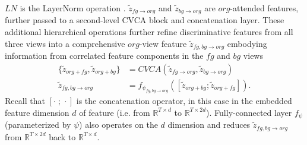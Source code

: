 $LN$ is the LayerNorm operation \cite{xu2019understanding}. $\tilde{z}_{fg \rightarrow org}$ and $\tilde{z}_{bg \rightarrow org}$ are $org$-attended features, further passed to a second-level CVCA block and concatenation layer. These additional hierarchical operations further refine discriminative features from all three views into a comprehensive $org$-view feature $\tilde{z}_{fg,bg \rightarrow org}$ embodying information from correlated feature components in the $fg$ and $bg$ views
\begin{equation}
\begin{split}
	\{\tilde{z}_{org+fg}, \tilde{z}_{org+bg}\} & = CVCA(\tilde{z}_{fg \rightarrow org}, \tilde{z}_{bg \rightarrow org}) \\
	\tilde{z}_{fg,bg \rightarrow org} & = f_{\psi_{fg,bg \rightarrow org}} ([\tilde{z}_{org+bg}; \tilde{z}_{org+fg}]).
\end{split}
\end{equation}
Recall that $[\cdot\; ;\, \cdot]$ is the concatenation operator, in this case in the embedded feature dimension $d$ of feature (i.e. from $\mathbb{R}^{T \times d}$ to $\mathbb{R}^{T \times 2d}$). Fully-connected layer $f_{\psi}$ (parameterized by $\psi$) also operates on the $d$ dimension and reduces $\tilde{z}_{fg,bg \rightarrow org}$ from $\mathbb{R}^{T \times 2d}$ back to $\mathbb{R}^{T \times d}$.

